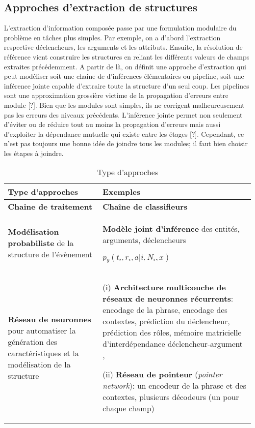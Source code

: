 \subsection{Approches d'extraction de structures}
L'extraction d'information composée passe par une formulation modulaire du problème en tâches plus simples. Par exemple, on a d'abord l'extraction respective déclencheurs, les arguments et les attributs. Ensuite, la résolution de référence vient construire les structures en reliant les différents valeurs de champs extraites précédemment. A partir de là, on définit une approche d'extraction qui peut modéliser soit une chaine de d'inférences élémentaires ou pipeline, soit une inférence jointe capable d'extraire toute la structure d'un seul coup. Les pipelines sont une approximation grossière victime de la propagation d'erreurs entre module [?]. Bien que les modules sont simples, ils ne corrigent malheureusement pas les erreurs des niveaux précédents. L'inférence jointe permet non seulement d'éviter ou de réduire tout au moins la propagation d'erreurs mais aussi d'exploiter la dépendance mutuelle qui existe entre les étages [?]. Cependant, ce n'est pas toujours une bonne idée de joindre tous les modules; il faut bien choisir les étapes à joindre.


\begin{table}[!h]
\small
\begin{tabular}{|p{}|p{}|}
\hline
\textbf{Type d'approches} & \textbf{Exemples} \\ \hline
\textbf{Chaine de traitement} & \textbf{Chaîne de classifieurs  }\cite{ahn2006stages} \\ \hline
\textbf{Modélisation probabiliste} de la structure de l'évènement & \textbf{Modèle joint d'inférence} des entités, arguments, déclencheurs

$p_\theta(t_i, r_i, a \vert i, N_i, x)$ \cite{yang2016jointEntityEvt} %
\\ \hline
\textbf{Réseau de neuronnes} pour automatiser la génération des caractéristiques et la modélisation de la structure & (i) \textbf{Architecture multicouche de réseaux de neuronnes récurrents}: encodage de la phrase, encodage des contextes, prédiction du déclencheur, prédiction des rôles, mémoire matricielle d'interdépendance déclencheur-argument \cite{nguyen2016jointtrgarg},  

(ii) \textbf{Réseau de pointeur} (\textit{pointer network}): un encodeur de la phrase et des contextes, plusieurs décodeurs (un pour chaque champ) \cite{palm2017e2e-dnn} \\ \hline
\end{tabular}
\caption{Type d'approches}
\end{table}


